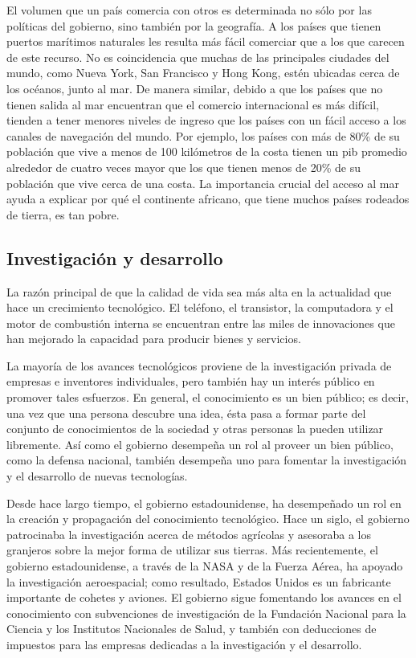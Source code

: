 \documentclass[
]{krantz}
\begin{document}
El volumen que un país comercia con otros es determinada no sólo por las políticas del gobierno, sino también por la geografía. A los países que tienen puertos marítimos naturales les resulta más fácil comerciar que a los que carecen de este recurso. No es coincidencia que muchas de las principales ciudades del mundo, como Nueva York, San Francisco y Hong Kong, estén ubicadas cerca de los océanos, junto al mar. De manera similar, debido a que los países que no tienen salida al mar encuentran que el comercio internacional es más difícil, tienden a tener menores niveles de ingreso que los países con un fácil acceso a los canales de navegación del mundo. Por ejemplo, los países con más de 80\% de su población que vive a menos de 100 kilómetros de la costa tienen un pib promedio alrededor de cuatro veces mayor que los que tienen menos de 20\% de su población que vive cerca de una costa. La importancia crucial del acceso al mar ayuda a explicar por qué el continente africano, que tiene muchos países rodeados de tierra, es tan pobre.

\hypertarget{investigaciuxf3n-y-desarrollo}{%
\subsection{Investigación y desarrollo}\label{investigaciuxf3n-y-desarrollo}}

La razón principal de que la calidad de vida sea más alta en la actualidad que hace un crecimiento tecnológico. El teléfono, el transistor, la computadora y el motor de combustión interna se encuentran entre las miles de innovaciones que han mejorado la capacidad para producir bienes y servicios.

La mayoría de los avances tecnológicos proviene de la investigación privada de empresas e inventores individuales, pero también hay un interés público en promover tales esfuerzos. En general, el conocimiento es un bien público; es decir, una vez que una persona descubre una idea, ésta pasa a formar parte del conjunto de conocimientos de la sociedad y otras personas la pueden utilizar libremente. Así como el gobierno desempeña un rol al proveer un bien público, como la defensa nacional, también desempeña uno para fomentar la investigación y el desarrollo de nuevas tecnologías.

Desde hace largo tiempo, el gobierno estadounidense, ha desempeñado un rol en la creación y propagación del conocimiento tecnológico. Hace un siglo, el gobierno patrocinaba la investigación acerca de métodos agrícolas y asesoraba a los granjeros sobre la mejor forma de utilizar sus tierras. Más recientemente, el gobierno estadounidense, a través de la NASA y de la Fuerza Aérea, ha apoyado la investigación aeroespacial; como resultado, Estados Unidos es un fabricante importante de cohetes y aviones. El gobierno sigue fomentando los avances en el conocimiento con subvenciones de investigación de la Fundación Nacional para la Ciencia y los Institutos Nacionales de Salud, y también con deducciones de impuestos para las empresas dedicadas a la investigación y el desarrollo.
\end{document}

